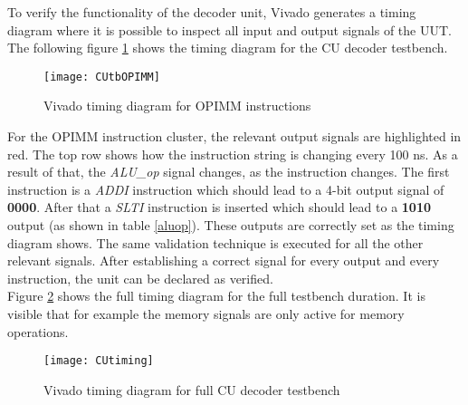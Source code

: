 To verify the functionality of the decoder unit, Vivado generates a timing diagram where it is possible to inspect all input and output signals of the UUT. The following figure \ref{fig:opimm} shows the timing diagram for the CU decoder testbench.
\begin{figure}[H]
	\centering
	\texttt{[image: CUtbOPIMM]}
	\caption{Vivado timing diagram for OPIMM instructions}
	\label{fig:opimm}
\end{figure}
For the OPIMM instruction cluster, the relevant output signals are highlighted in red. The top row shows how the instruction string is changing every 100 ns. As a result of that, the \textit{ALU\_op} signal changes, as the instruction changes. The first instruction is a \textit{ADDI} instruction which should lead to a 4-bit output signal of \textbf{0000}. After that a \textit{SLTI} instruction is inserted which should lead to a \textbf{1010} output (as shown in table \ref{aluop}). These outputs are correctly set as the timing diagram shows. The same validation technique is executed for all the other relevant signals. After establishing a correct signal for every output and every instruction, the unit can be declared as verified.\\
Figure \ref{fig:cutiming} shows the full timing diagram for the full testbench duration. It is visible that for example the memory signals are only active for memory operations.
\begin{figure}[H]
	\centering
	\texttt{[image: CUtiming]}
	\caption{Vivado timing diagram for full CU decoder testbench}
	\label{fig:cutiming}
\end{figure}

